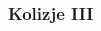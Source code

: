 \documentclass[aspectratio=169]{beamer}
\begin{document}
\begin{frame}%
	\frametitle{Kolizje III}
	\begin{columns}
		\begin{column}{0.5\textwidth}
	   	 	\begin{figure}
	   		 \centering
	    		\end{figure}
		\end{column}
		\begin{column}{0.5\textwidth}
	   	 	\begin{figure}
	   		 \centering
	    		\end{figure}
		\end{column}
	\end{columns}
\end{frame}
\end{document}
